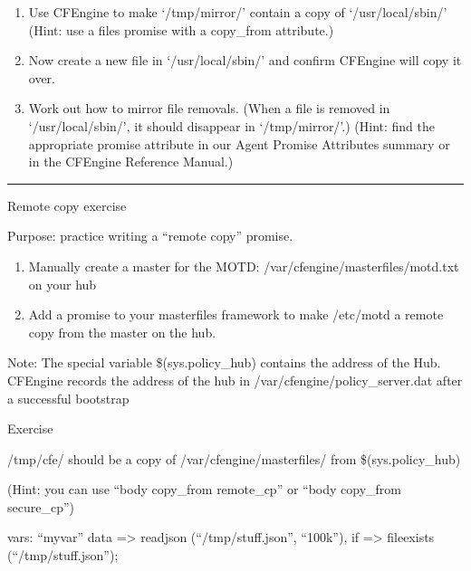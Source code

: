 \begin{aside}
\label{aside:exercise_32}

\begin{enumerate}
\item{} Use CFEngine to make `/tmp/mirror/' contain a copy of `/usr/local/sbin/'
(Hint: use a files promise with a copy\_from attribute.)
\item{} Now create a new file in `/usr/local/sbin/' and confirm CFEngine will copy it over.
\item{} Work out how to mirror file removals. (When a file is removed in `/usr/local/sbin/', it should disappear in `/tmp/mirror/'.)  (Hint: find the appropriate promise attribute in our Agent Promise Attributes summary or in the CFEngine Reference Manual.)
\end{enumerate}

\begin{center}
\rule{3in}{0.4pt}
\end{center}
Remote copy exercise

Purpose: practice writing a ``remote copy'' promise.

\begin{enumerate}
\item{} Manually create a master for the MOTD: /var/cfengine/masterfiles/motd.txt on your hub
\item{} Add a promise to your masterfiles framework to make /etc/motd a remote copy from the master on the hub.
\end{enumerate}

Note: The special variable \$(sys.policy\_hub) contains the address of the Hub.  CFEngine records the address of the hub in /var/cfengine/policy\_server.dat after a successful bootstrap

Exercise

/tmp/cfe/ should be a copy of /var/cfengine/masterfiles/ from \$(sys.policy\_hub)

(Hint: you can use ``body copy\_from remote\_cp'' or ``body copy\_from secure\_cp'')

vars:
  ``myvar''
    data =\textgreater{} readjson (``/tmp/stuff.json'', ``100k''),
    if =\textgreater{} fileexists (``/tmp/stuff.json'');

\end{aside}
